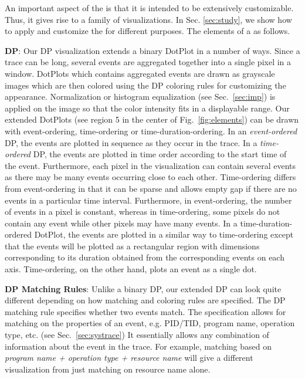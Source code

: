 An important aspect of the \VDP{} is that it is intended to 
be extensively customizable. Thus, it gives rise to a family of visualizations.
In Sec. \ref{sec:study}, we show how to apply and customize
the \VDP{} for different purposes. The elements of a \VDP{} as follows.

{\bf DP}:
Our DP visualization extends a binary DotPlot in a number of ways.
Since a trace can be long, several events are aggregated 
together into a single pixel in a window.
DotPlots which contains aggregated events are drawn as grayscale images
which are then colored using the DP coloring rules for customizing
the appearance.
Normalization or histogram equalization (see Sec.~\ref{sec:imp})
is applied on the image so that the color intensity fits in a displayable range.
Our extended DotPlots (see region 5 in the center of Fig.~\ref{fig:elements})
can be drawn with event-ordering, time-ordering or time-duration-ordering.
In an {\em event-ordered} DP, the events are plotted in
sequence as they occur in the trace.
In a {\em time-ordered} DP, the events are plotted in time order
according to the start time of the event.
Furthermore, each pixel in the visualization can contain several events
as there may be many events occurring close to each other.
Time-ordering differs from event-ordering in that it can be sparse
and allows empty gap if there are no events in a particular time interval.
Furthermore, in event-ordering,
the number of events in a pixel is constant, whereas
in time-ordering,
some pixels do not contain any event while other pixels may have many events.
In a time-duration-ordered DotPlot, the events are plotted in a similar way
to time-ordering
except that the events will be plotted as a rectangular region
with dimensions corresponding to its duration obtained from
the corresponding events on each axis.
Time-ordering, on the other hand, plots 
an event as a single dot.

{\bf DP Matching Rules}:
Unlike a binary DP, our extended DP can look quite different depending
on how matching and coloring rules are specified.
The DP matching rule specifies whether two events
match. The specification allows for matching on 
the properties of an event, e.g. PID/TID, program name,
operation type, etc. (see Sec.~\ref{sec:systrace})
It essentially allows any combination of information about
the event in the trace.
For example, matching based on {\it program name + operation type + resource name}
will give a different visualization from just matching on resource name alone.

